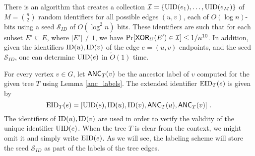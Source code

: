\begin{lemma}
\label{cl:epsbias}
There is an algorithm that creates a collection $\mathcal{I}=\{\operatorname{UID}(e_1), \ldots, \operatorname{UID}(e_{M})\}$ of $M=\binom{n}{2}$ random identifiers for all possible edges $(u,v)$, each of $O(\log n)$-bits using a seed $\mathcal{S}_{ID}$ of $O(\log^2 n)$ bits. These identifiers are such that for each subset $E' \subseteq E$, where $|E'|\neq 1$, we have $\Pr[\mathsf{XOR}_U(E') \in \mathcal{I}] \leq 1/n^{10}$. In addition, given the identifiers $\operatorname{ID}(u), \operatorname{ID}(v)$ of the edge $e=(u,v)$ endpoints, and the seed $\mathcal{S}_{ID}$, one can determine $\operatorname{UID}(e)$ in $\widetilde{O}(1)$ time.
\end{lemma}
\def\APPENDUNIQUEID{
\begin{proof}[Proof of Lemma \ref{cl:epsbias}]
The lemma is proved in \cite{GhaffariP16}, the only part that is not discussed there is the time to determine $\UID(e)$ that follows from \cite{naor1993small}. 
By Theorem 3.1 of \cite{naor1993small}, given the seed $\mathcal{S}_{ID}$ and the edge identifier $e_j=(\ID(u), \ID(v))$, determining the $i^{th}$ bit of $\UID(e_{j})$ can be done in $O(\log n)$ time. Thus, determining all $O(\log n)$ bits, takes $O(\log^2 n)$ time. 
\end{proof}
}%
For every vertex $v \in G$, let $\mathsf{ANC}_T(v)$ be the ancestor label of $v$ computed for the given tree $T$ using Lemma \ref{anc_labels}. The extended identifier $\operatorname{EID}_T(e)$ is given by
\begin{equation}\label{eq:extend-ID}
\operatorname{EID}_T(e)=[\operatorname{UID}(e), \operatorname{ID}(u), \operatorname{ID}(v), \mathsf{ANC}_T(u), \mathsf{ANC}_T(v)]~.
\end{equation}
The identifiers of $\operatorname{ID}(u), \operatorname{ID}(v)$ are used in order to verify the validity of the unique identifier $\operatorname{UID}(e)$.  
When the tree $T$ is clear from the context, we might omit it and simply write $\operatorname{EID}(e)$. As we will see, the labeling scheme will store the seed $\mathcal{S}_{ID}$ as part of the labels of the tree edges. 


